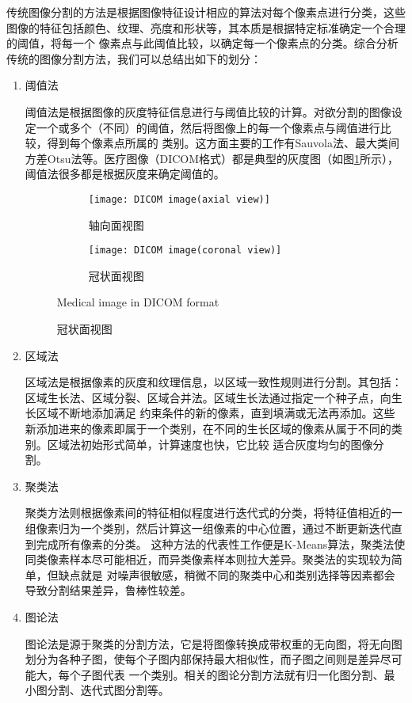 	传统图像分割的方法是根据图像特征设计相应的算法对每个像素点进行分类，这些图像的特征包括颜色、纹理、亮度和形状等，其本质是根据特定标准确定一个合理的阈值，将每一个
	像素点与此阈值比较，以确定每一个像素点的分类。综合分析传统的图像分割方法，我们可以总结出如下的划分：
	\begin{enumerate}
		\item 阈值法
		
		阈值法是根据图像的灰度特征信息进行与阈值比较的计算。对欲分割的图像设定一个或多个（不同）的阈值，然后将图像上的每一个像素点与阈值进行比较，得到每个像素点所属的
		类别。这方面主要的工作有Sauvola法\cite{sauvola2000adaptive}、最大类间方差Otsu法\cite{otsu1979threshold}等。医疗图像（DICOM格式\cite{mustra2008overview}）都是典型的灰度图（如图\ref{fig:medical_image}所示），阈值法很多都是根据灰度来确定阈值的。
		\begin{figure}[!htp]
			\centering
			\begin{subfigure}{\textwidth}
				\centering
				\texttt{[image: DICOM image(axial view)]}
				\caption{轴向面视图}
			\end{subfigure}
			
			\vspace{2mm}
			
			\begin{subfigure}{\textwidth}
				\centering
				\texttt{[image: DICOM image(coronal view)]}
				\caption{冠状面视图}
			\end{subfigure}
				{Medical image in DICOM format}
			\label{fig:medical_image}
		\end{figure}
		
		\item 区域法
		
		区域法是根据像素的灰度和纹理信息，以区域一致性规则进行分割。其包括：区域生长法、区域分裂、区域合并法。区域生长法通过指定一个种子点，向生长区域不断地添加满足
		约束条件的新的像素，直到填满或无法再添加。这些新添加进来的像素即属于一个类别，在不同的生长区域的像素从属于不同的类别。区域法初始形式简单，计算速度也快，它比较
		适合灰度均匀的图像分割。
		
		\item 聚类法
		
		聚类方法则根据像素间的特征相似程度进行迭代式的分类，将特征值相近的一组像素归为一个类别，然后计算这一组像素的中心位置，通过不断更新迭代直到完成所有像素的分类。
		这种方法的代表性工作便是K-Means算法\cite{macqueen1965some}，聚类法使同类像素样本尽可能相近，而异类像素样本则拉大差异。聚类法的实现较为简单，但缺点就是
		对噪声很敏感，稍微不同的聚类中心和类别选择等因素都会导致分割结果差异，鲁棒性较差。
		
		\item 图论法
		
		图论法是源于聚类的分割方法，它是将图像转换成带权重的无向图，将无向图划分为各种子图，使每个子图内部保持最大相似性，而子图之间则是差异尽可能大，每个子图代表
		一个类别。相关的图论分割方法就有归一化图分割、最小图分割、迭代式图分割等。
	\end{enumerate}
	
